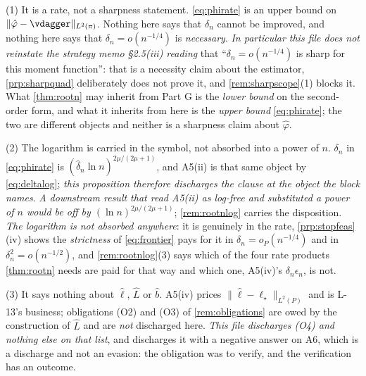 \begin{remark}\label{rem:phirscope}
(1) It is a rate, not a sharpness statement. \eqref{eq:phirate} is an upper bound on
$\|\hat\varphi-\vdagger\|_{L^{2}(\pi)}$. Nothing here says that $\delta_n$ cannot be improved, and
nothing here says that $\delta_n=o(n^{-1/4})$ is \emph{necessary}. \emph{In particular this file does
not reinstate the strategy memo \S2.5(iii) reading} that ``$\delta_n=o(n^{-1/4})$ is sharp for this
moment function'': that is a necessity claim about the estimator, \cref{prp:sharpquad} deliberately
does not prove it, and \cref{rem:sharpscope}\textup{(1)} blocks it. What \cref{thm:rootn} may inherit
from Part G is the \emph{lower bound} on the second-order form, and what it inherits from here is the
\emph{upper bound} \eqref{eq:phirate}; the two are different objects and neither is a sharpness claim
about $\hat\varphi$.

(2) The logarithm is carried in the symbol, not absorbed into a power of $n$.
$\delta_n$ in \eqref{eq:phirate} is $(\hat\delta_n\ln n)^{2\mu/(2\mu+1)}$, and A5(ii) is
that same object by \eqref{eq:deltalog}; \emph{this proposition therefore discharges the clause at the
object the block names}. \emph{A downstream result that read A5(ii) as log-free and substituted a
power of $n$ would be off by $(\ln n)^{2\mu/(2\mu+1)}$}; \cref{rem:rootnlog} carries the disposition.
\emph{The logarithm is not absorbed anywhere}: it is genuinely in the rate,
\cref{prp:stopfeas}\textup{(iv)} shows the \emph{strictness} of \eqref{eq:frontier} pays for it in
$\delta_n=o_P(n^{-1/4})$ and in $\delta_n^{2}=o(n^{-1/2})$, and \cref{rem:rootnlog}\textup{(3)} says which
of the four rate products \cref{thm:rootn} needs are paid for that way and which one, A5(iv)'s
$\delta_n\epsilon_n$, is not.

(3) It says nothing about $\hat\ell$, $\hat L$ or $\hat b$. A5(iv) prices
$\|\hat\ell-\ell_\star\|_{L^{2}(P)}$ and is L-13's business; obligations \textup{(O2)} and
\textup{(O3)} of \cref{rem:obligations} are owed by the construction of $\hat L$ and are \emph{not}
discharged here. \emph{This file discharges \textup{(O4)} and nothing else on that list}, and
discharges it with a negative answer on A6, which is a discharge and not an evasion: the obligation was
to verify, and the verification has an outcome.


\end{remark}
